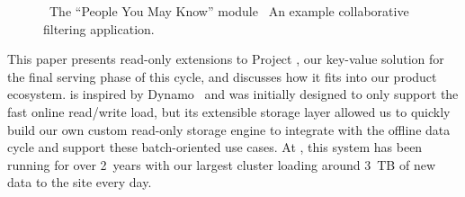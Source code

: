 \begin{figure}
\centering
{}


\caption{~The ``People You May Know'' module
~An example collaborative filtering
application.}
\end{figure}

This paper presents read-only extensions to Project \projectname{},
our key-value solution for the final serving phase of this cycle, and
discusses how it fits into our product ecosystem. \projectname{} is
inspired by Dynamo~\cite{dynamo} and was initially designed to only
support the fast online read/write load, but its extensible storage
layer allowed us to quickly build our own custom read-only storage
engine to integrate with the offline data cycle and support these
batch-oriented use cases. At \linkedin, this system has been running
for over 2~years with our largest cluster loading around 3~TB of new
data to the site every day. 

